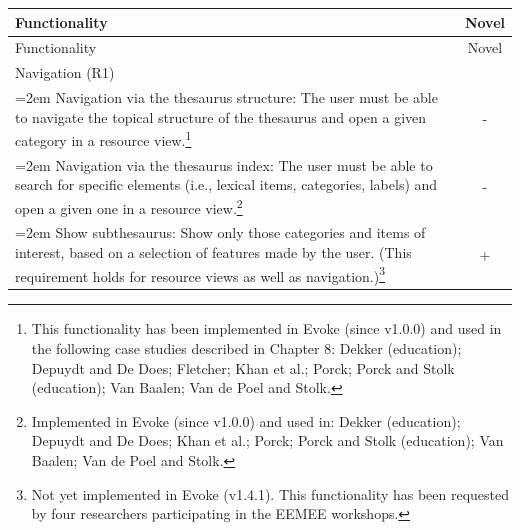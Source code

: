 \begin{longtable}[h!]{>{\raggedright\small}p{4.5in}c}
    \toprule
    Functionality & Novel \\
    \midrule
    \endfirsthead
    \toprule
    Functionality & Novel \\
    \midrule
    \endhead

\rowcolor{lightgray!50!}Navigation (R1) &\\

    \hangindent=2em
    Navigation via the thesaurus structure: \linebreak     
    The user must be able to navigate the topical structure of the thesaurus and open a given category in a resource view.\footnote{This functionality has been implemented in Evoke (since v1.0.0) and used in the following case studies described in Chapter 8: Dekker (education); Depuydt and De Does; Fletcher; Khan et al.; Porck; Porck and Stolk (education); Van Baalen; Van de Poel and Stolk.} & - \\

    \hangindent=2em
    Navigation via the thesaurus index: \linebreak
    The user must be able to search for specific elements (i.e., lexical items, categories, labels) and open a given one in a resource view.\footnote{Implemented in Evoke (since v1.0.0) and used in: Dekker (education); Depuydt and De Does; Khan et al.; Porck; Porck and Stolk (education); Van Baalen; Van de Poel and Stolk.} & - \\

	

    \hangindent=2em
    Show subthesaurus: \linebreak
    Show only those categories and items of interest, based on a selection of features made by the user.
    (This requirement holds for resource views as well as navigation.)\footnote{Not yet implemented in Evoke (v1.4.1). This functionality has been requested by four researchers participating in the EEMEE workshops.} & + \\


\end{longtable}
